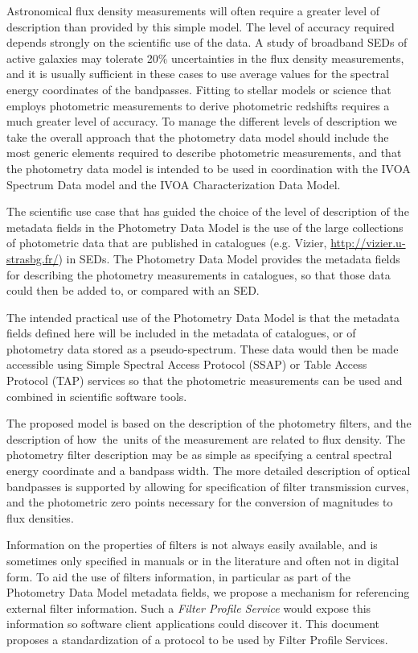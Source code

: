 \documentclass[11pt,a4paper]{ivoa}
\begin{document}
Astronomical flux density measurements will often require a greater level of description than provided by this simple model. The level of accuracy required depends strongly on the scientific use of the data. A study of broadband SEDs of active galaxies may tolerate 20$\%$  uncertainties in the flux density measurements, and it is usually sufficient in these cases to use average values for the spectral energy coordinates of the bandpasses. Fitting to stellar models or science that employs photometric measurements to derive photometric redshifts requires a much greater level of accuracy. To manage the different levels of description we take the overall approach that the photometry data model should include the most generic elements required to describe photometric measurements, and that the photometry data model is intended to be used in coordination with the IVOA Spectrum Data model and the IVOA Characterization Data Model.

The scientific use case that has guided the choice of the level of description of the metadata fields in the Photometry Data Model is the use of the large collections of photometric data that are published in catalogues (e.g. Vizier, \url{http://vizier.u-strasbg.fr/}) in SEDs. The Photometry Data Model provides the metadata fields for describing the photometry measurements in catalogues, so that those data could then be added to, or compared with an SED.

The intended practical use of the Photometry Data Model is that the metadata fields defined here will be included in the metadata of catalogues, or of photometry data stored as a pseudo-spectrum. These data would then be made accessible using Simple Spectral Access Protocol (SSAP) or Table Access Protocol (TAP) services so that the photometric measurements can be used and combined in scientific software tools.

The proposed model is based on the description of the photometry filters, and the description of how\ the\ units of the measurement are related to flux density. The photometry filter description may be as simple as specifying a central spectral energy coordinate and a bandpass width. The more detailed description of optical bandpasses is supported by allowing for specification of filter transmission curves, and the   photometric zero points necessary for the conversion of magnitudes to flux densities.

Information on the properties of filters is not always easily available, and is sometimes only specified in manuals or in the literature and often not in digital form. To aid the use of filters information, in particular as part of the Photometry Data Model metadata fields, we propose a mechanism for referencing external filter information. Such a \textit{Filter Profile Service} would expose this information so software client applications could discover it. This document proposes a standardization of a protocol to be used by Filter Profile Services.
\end{document}
